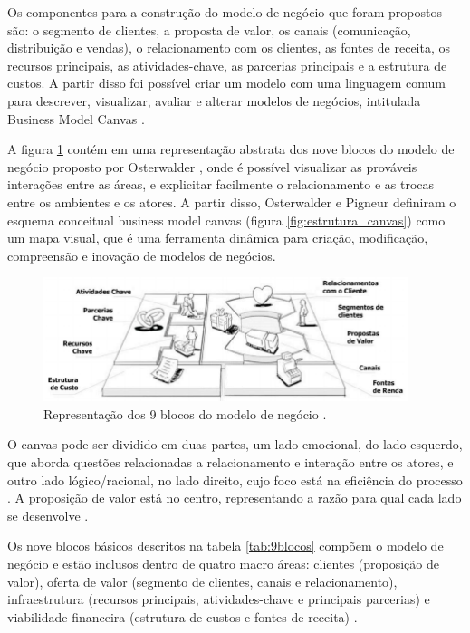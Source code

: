 Os componentes para a construção do modelo de negócio que foram propostos são: o segmento de clientes, a proposta de valor, os canais
(comunicação, distribuição e vendas), o relacionamento com os clientes, as fontes de receita, os recursos principais, as atividades-chave, as parcerias principais e a estrutura de custos. A partir disso foi possível criar um modelo com uma linguagem comum para descrever, visualizar, avaliar e alterar modelos de negócios, intitulada Business Model Canvas \cite{bmc2011}.

A figura \ref{fig:BMC_Abstrato} contém em uma representação abstrata dos nove blocos do modelo de negócio proposto por Osterwalder \cite{bmctese2004}, onde é possível visualizar as prováveis interações entre as áreas, e explicitar facilmente o relacionamento e as trocas entre os ambientes e os atores. A partir disso, Osterwalder e Pigneur \cite{bmc2011} definiram o esquema conceitual business model canvas (figura \ref{fig:estrutura_canvas}) como um mapa visual, que é uma ferramenta dinâmica para criação, modificação, compreensão e inovação de modelos de negócios.

\begin{figure}[H]
 \centering
  \includegraphics[width=0.95\textwidth]{./fig/BMC_Abstrato}
 \caption{Representação dos 9 blocos do modelo de negócio \cite{bmc2011}.}
 \label{fig:BMC_Abstrato}
\end{figure}

O canvas pode ser dividido em duas partes, um lado emocional, do lado esquerdo, que aborda questões relacionadas a relacionamento e interação entre os atores, e outro lado lógico/racional, no lado direito, cujo foco está na eficiência do processo \cite{bmcmoveis2013}. A proposição de valor está no centro, representando a razão para qual cada lado se desenvolve \cite{bmc2011}.

Os nove blocos básicos descritos na tabela \ref{tab:9blocos} compõem o modelo de negócio e estão inclusos dentro de quatro macro áreas: clientes (proposição de valor), oferta de valor (segmento de clientes, canais e relacionamento), infraestrutura (recursos principais, atividades-chave e principais parcerias) e viabilidade financeira (estrutura de custos e fontes de receita) \cite{bmc2011}. 

